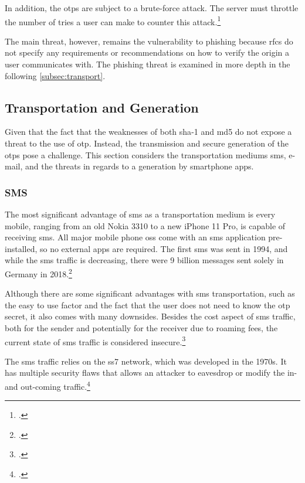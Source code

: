 In addition, the \glspl{otp} are subject to a brute-force attack. The server must throttle the number of tries a user can make to counter this attack.\footcites[See][6]{m2011rfc}[See][21-22]{m2005rfc}[See][240]{Schwartz2018}

The main threat, however, remains the vulnerability to phishing because \glspl{rfc} do not specify any requirements or recommendations on how to verify the origin a user communicates with. The phishing threat is examined in more depth in the following \autoref{subsec:transport}.

\subsection{Transportation and Generation}
\label{subsec:transport}

Given that the fact that the weaknesses of both \gls{sha}-1 and \gls{md}5 do not expose a threat to the use of \gls{otp}. Instead, the transmission and secure generation of the \glspl{otp} pose a challenge. This section considers the transportation mediums \gls{sms}, e-mail, and the threats in regards to a generation by smartphone apps.

\subsubsection{SMS}

The most significant advantage of \gls{sms} as a transportation medium is every mobile, ranging from an old Nokia 3310 to a new iPhone 11 Pro, is capable of receiving \gls{sms}. All major mobile phone \glspl{os} come with an \gls{sms} application pre-installed, so no external apps are required. The first \gls{sms} was sent in 1994, and while the \gls{sms} traffic is decreasing, there were 9 billion messages sent solely in Germany in 2018.\footcites[See][2--3]{alpert2012mobile}[See][57]{bundesnetzagentur}

Although there are some significant advantages with \gls{sms} transportation, such as the easy to use factor and the fact that the user does not need to know the \gls{otp} secret, it also comes with many downsides. Besides the cost aspect of \gls{sms} traffic, both for the sender and potentially for the receiver due to roaming fees, the current state of \gls{sms} traffic is considered insecure.\footcites[See][167]{8632643}

The \gls{sms} traffic relies on the \gls{ss7} network, which was developed in the 1970s. It has multiple security flaws that allows an attacker to eavesdrop or modify the in- and out-coming traffic.\footcites[See][17--18]{WELCH201717}[See][3--4]{7997246}[See][40, 46]{puzankov2017stealthy}

